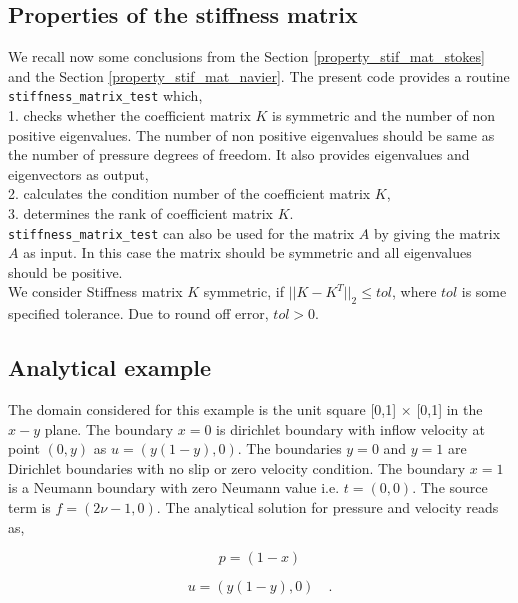 \documentclass[a4paper,openany]{book}
\begin{document}
\subsection{Properties of the stiffness matrix}

We recall now some conclusions from the Section \ref{property_stif_mat_stokes} and the Section \ref{property_stif_mat_navier}. The present code provides a routine \verb|stiffness_matrix_test| which, \\

1. checks whether the coefficient matrix $K$ is symmetric and the number of non positive eigenvalues. The number of non positive eigenvalues should be same as the number of pressure degrees of freedom. It also provides eigenvalues and eigenvectors as output,\\

2. calculates the condition number of the coefficient matrix $K$, \\

3. determines the rank of coefficient matrix $K$.\\

\verb|stiffness_matrix_test| can also be used for the matrix $A$ by giving the matrix $A$ as input. In this case the matrix should be symmetric and all eigenvalues should be positive.\\

We consider Stiffness matrix $K$ symmetric, if $||K-K^T||_2 \leq tol$, where $tol$ is some specified tolerance. Due to round off error, $tol > 0$.   

\subsection{Analytical example}

The domain considered for this example is the unit square [0,1] $\times$ [0,1] in the $x-y$ plane. 
The boundary ${x=0}$ is dirichlet boundary with inflow velocity at point $(0,y)$ as $u = (y(1-y), 0)$. The boundaries ${y = 0}$ and ${y = 1}$ are Dirichlet boundaries with no slip or zero velocity condition. The boundary ${x = 1}$ is a Neumann boundary with zero Neumann value i.e. $t = (0, 0)$. The source term is $f = (2 \nu - 1, 0)$. The analytical solution for pressure and velocity reads as,

\begin{center}

\begin{equation}
p = (1 - x)
\end{equation}

\begin{equation} 
 u = (y(1-y), 0) \quad \textrm{.}
\end{equation}

\end{center}
\end{document}
